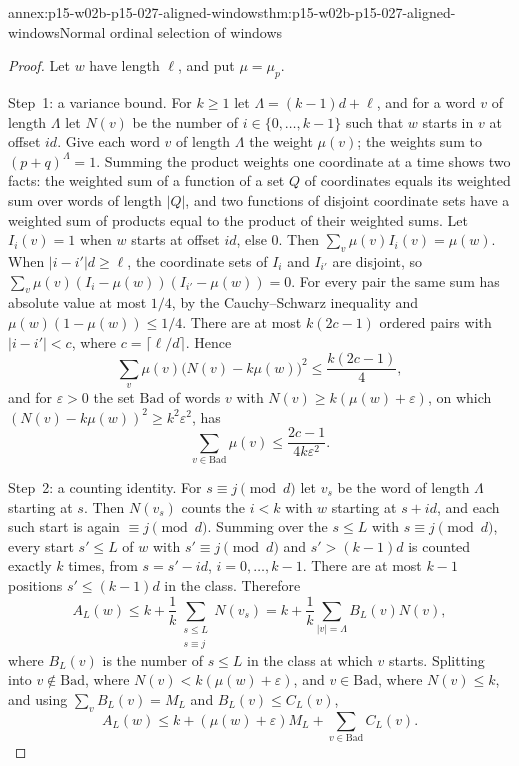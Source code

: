\begin{annexitem}{annex:p15-w02b-p15-027-aligned-windows}{thm:p15-w02b-p15-027-aligned-windows}{Normal ordinal selection of windows}
\begin{proof}
Let \(w\) have length \(\ell\), and put \(\mu=\mu_p\).

Step~1: a variance bound. For \(k\geq1\) let \(\Lambda=(k-1)d+\ell\), and
for a word \(v\) of length \(\Lambda\) let \(N(v)\) be the number of
\(i\in\{0,\ldots,k-1\}\) such that \(w\) starts in \(v\) at offset
\(id\). Give each word \(v\) of length \(\Lambda\) the weight
\(\mu(v)\); the weights sum to \((p+q)^\Lambda=1\). Summing the product
weights one coordinate at a time shows two facts: the weighted sum of a
function of a set \(Q\) of coordinates equals its weighted sum over words
of length \(|Q|\), and two functions of disjoint coordinate sets have a
weighted sum of products equal to the product of their weighted sums.
Let \(I_i(v)=1\) when \(w\) starts at offset \(id\), else \(0\). Then
\(\sum_v\mu(v)I_i(v)=\mu(w)\). When \(|i-i'|d\geq\ell\), the coordinate
sets of \(I_i\) and \(I_{i'}\) are disjoint, so
\(\sum_v\mu(v)(I_i-\mu(w))(I_{i'}-\mu(w))=0\). For every pair the same
sum has absolute value at most \(1/4\), by the Cauchy--Schwarz inequality
and \(\mu(w)(1-\mu(w))\leq1/4\). There are at most \(k(2c-1)\) ordered
pairs with \(|i-i'|<c\), where \(c=\lceil\ell/d\rceil\). Hence
\[
 \sum_v\mu(v)\bigl(N(v)-k\mu(w)\bigr)^2\leq\frac{k(2c-1)}{4},
\]
and for \(\varepsilon>0\) the set \(\mathrm{Bad}\) of words \(v\) with
\(N(v)\geq k(\mu(w)+\varepsilon)\), on which
\((N(v)-k\mu(w))^2\geq k^2\varepsilon^2\), has
\[
 \sum_{v\in\mathrm{Bad}}\mu(v)\leq\frac{2c-1}{4k\varepsilon^2}. \tag{b}
\]

Step~2: a counting identity. For \(s\equiv j\pmod d\) let \(v_s\) be the
word of length \(\Lambda\) starting at \(s\). Then \(N(v_s)\) counts the
\(i<k\) with \(w\) starting at \(s+id\), and each such start is again
\(\equiv j\pmod d\). Summing over the \(s\leq L\) with \(s\equiv j\pmod
d\), every start \(s'\leq L\) of \(w\) with \(s'\equiv j\pmod d\) and
\(s'>(k-1)d\) is counted exactly \(k\) times, from \(s=s'-id\),
\(i=0,\ldots,k-1\). There are at most \(k-1\) positions \(s'\leq(k-1)d\)
in the class. Therefore
\[
 A_L(w)\leq k+\frac1k\sum_{\substack{s\leq L\\ s\equiv j}}N(v_s)
 =k+\frac1k\sum_{|v|=\Lambda}B_L(v)N(v),
\]
where \(B_L(v)\) is the number of \(s\leq L\) in the class at which \(v\)
starts. Splitting into \(v\notin\mathrm{Bad}\), where
\(N(v)<k(\mu(w)+\varepsilon)\), and \(v\in\mathrm{Bad}\), where
\(N(v)\leq k\), and using \(\sum_vB_L(v)=M_L\) and
\(B_L(v)\leq C_L(v)\),
\[
 A_L(w)\leq k+(\mu(w)+\varepsilon)M_L+\sum_{v\in\mathrm{Bad}}C_L(v). \tag{c}
\]


\end{proof}
\end{annexitem}
